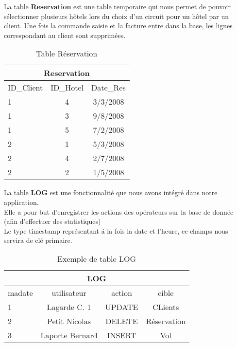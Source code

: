 
\begin{table}[h]
La table \textbf{Reservation} est une table temporaire qui nous permet de pouvoir s\'electionner plusieurs h\^otels lors du choix d'un circuit pour un h\^otel par un client. Une fois la commande saisie et la facture entre dans la base, les lignes correspondant au client sont supprim\'ees.
\begin{center}
\begin{tabular}{|l|c|c|}
\hline
\multicolumn{3}{|c|}{Reservation}\\
\hline
ID\_Client& ID\_Hotel&Date\_Res\\
\hline
1 & 4&3/3/2008\\
\hline
1 & 3&9/8/2008\\
\hline
1 & 5&7/2/2008\\
\hline
2 & 1&5/3/2008\\
\hline
2&4&2/7/2008\\
\hline
2 & 2&1/5/2008\\
\hline
\end{tabular}
\end{center}
\caption{Table R\'eservation}
\end{table}

\begin{table}[h]
 La table \textbf{LOG} est une fonctionnalit\'e que nous avons int\'egr\'e dans notre application. \\
 Elle a pour but d'enregistrer les actions des op\'erateurs sur la base de donn\'ee (afin d'effectuer des statistiques)\\
Le type timestamp repr\'esentant \'a la fois la date et l'heure, ce champs nous servira de cl\'e primaire.
\begin{center}
\begin{tabular}{|l|c|c|c|}
\hline
\multicolumn{4}{|c|}{LOG}\\
\hline
madate&utilisateur&action&cible\\
\hline
1 &Lagarde C. 1&UPDATE&CLients\\
\hline
2 &Petit Nicolas&DELETE&R\'eservation\\
\hline
3 &Laporte Bernard&INSERT&Vol\\
\hline
\end{tabular}
\end{center}
\caption{Exemple de table LOG}
\end{table}
\newpage

